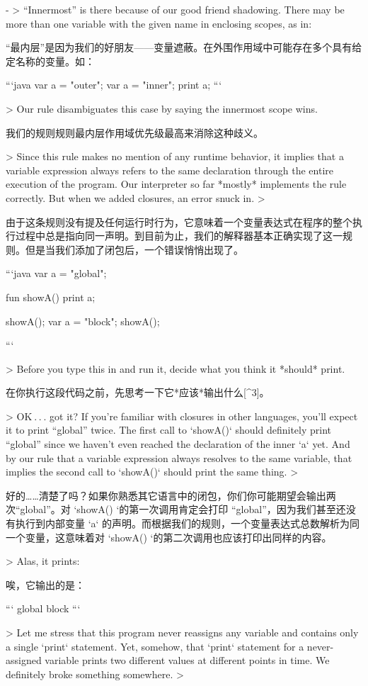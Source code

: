 \documentclass[cn,11pt,chinese]{elegantbook}
\begin{document}
{{{{{{{{{{{{- > “Innermost” is there because of our good friend shadowing. There may be more than one variable with the given name in enclosing scopes, as in:

  “最内层”是因为我们的好朋友——变量遮蔽。在外围作用域中可能存在多个具有给定名称的变量。如：
  
  ```java
  var a = "outer";
  {
    var a = "inner";
    print a;
  }
  ```
  
  > Our rule disambiguates this case by saying the innermost scope wins.
  
  我们的规则规则最内层作用域优先级最高来消除这种歧义。

> Since this rule makes no mention of any runtime behavior, it implies that a variable expression always refers to the same declaration through the entire execution of the program. Our interpreter so far *mostly* implements the rule correctly. But when we added closures, an error snuck in.
>

由于这条规则没有提及任何运行时行为，它意味着一个变量表达式在程序的整个执行过程中总是指向同一声明。到目前为止，我们的解释器基本正确实现了这一规则。但是当我们添加了闭包后，一个错误悄悄出现了。

```java
var a = "global";
{
  fun showA() {
    print a;
  }

  showA();
  var a = "block";
  showA();
}
```

> Before you type this in and run it, decide what you think it *should* print.

在你执行这段代码之前，先思考一下它*应该*输出什么[^3]。

> OK . . . got it? If you’re familiar with closures in other languages, you’ll expect it to print “global” twice. The first call to `showA()` should definitely print “global” since we haven’t even reached the declaration of the inner `a` yet. And by our rule that a variable expression always resolves to the same variable, that implies the second call to `showA()` should print the same thing.
>

好的……清楚了吗？如果你熟悉其它语言中的闭包，你们你可能期望会输出两次“global”。对 `showA() `的第一次调用肯定会打印 “global”，因为我们甚至还没有执行到内部变量 `a` 的声明。而根据我们的规则，一个变量表达式总数解析为同一个变量，这意味着对 `showA() `的第二次调用也应该打印出同样的内容。

> Alas, it prints:

唉，它输出的是：

```
global
block
```

> Let me stress that this program never reassigns any variable and contains only a single `print` statement. Yet, somehow, that `print` statement for a never-assigned variable prints two different values at different points in time. We definitely broke something somewhere.
>

}}}}}}}}}}}}
\end{document}
